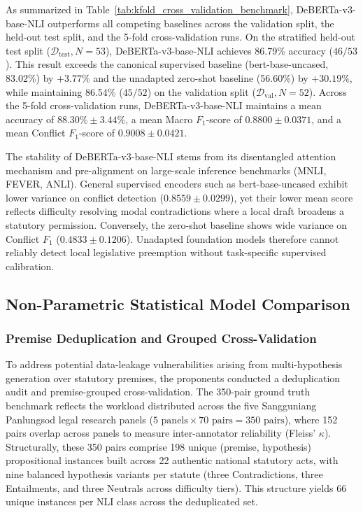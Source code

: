 As summarized in Table~\ref{tab:kfold_cross_validation_benchmark}, DeBERTa-v3-base-NLI outperforms all competing baselines across the validation split, the held-out test split, and the 5-fold cross-validation runs. On the stratified held-out test split ($\mathcal{D}_{\text{test}}, N = 53$), DeBERTa-v3-base-NLI achieves 86.79\% accuracy ($46/53$). This result exceeds the canonical supervised baseline (bert-base-uncased, 83.02\%) by $+3.77\%$ and the unadapted zero-shot baseline (56.60\%) by $+30.19\%$, while maintaining 86.54\% ($45/52$) on the validation split ($\mathcal{D}_{\text{val}}, N = 52$). Across the 5-fold cross-validation runs, DeBERTa-v3-base-NLI maintains a mean accuracy of $88.30\% \pm 3.44\%$, a mean Macro $F_1$-score of $0.8800 \pm 0.0371$, and a mean Conflict $F_1$-score of $0.9008 \pm 0.0421$.

The stability of DeBERTa-v3-base-NLI stems from its disentangled attention mechanism and pre-alignment on large-scale inference benchmarks (MNLI, FEVER, ANLI). General supervised encoders such as bert-base-uncased exhibit lower variance on conflict detection ($0.8559 \pm 0.0299$), yet their lower mean score reflects difficulty resolving modal contradictions where a local draft broadens a statutory permission. Conversely, the zero-shot baseline shows wide variance on Conflict $F_1$ ($0.4833 \pm 0.1206$). Unadapted foundation models therefore cannot reliably detect local legislative preemption without task-specific supervised calibration.


\subsection{Non-Parametric Statistical Model Comparison}
\label{sec:statistical_model_comparison}

\subsubsection{Premise Deduplication and Grouped Cross-Validation}
\label{sec:premise_grouped_cv}

To address potential data-leakage vulnerabilities arising from multi-hypothesis generation over statutory premises, the proponents conducted a deduplication audit and premise-grouped cross-validation. The 350-pair ground truth benchmark reflects the workload distributed across the five Sangguniang Panlungsod legal research panels ($5\text{ panels} \times 70\text{ pairs} = 350\text{ pairs}$), where 152 pairs overlap across panels to measure inter-annotator reliability (Fleiss' $\kappa$). Structurally, these 350 pairs comprise 198 unique (premise, hypothesis) propositional instances built across 22 authentic national statutory acts, with nine balanced hypothesis variants per statute (three Contradictions, three Entailments, and three Neutrals across difficulty tiers). This structure yields 66 unique instances per NLI class across the deduplicated set.


